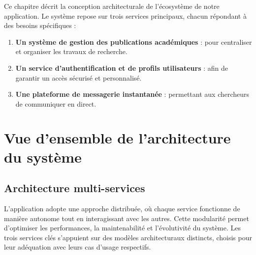 \documentclass{rapportPfe}
\begin{document}
Ce chapitre décrit la conception architecturale de l'écosystème de notre application. Le système repose sur trois services principaux, chacun répondant à des besoins spécifiques :

\begin{enumerate}
    \item \textbf{Un système de gestion des publications académiques} : pour centraliser et organiser les travaux de recherche.
    
    \item \textbf{Un service d’authentification et de profils utilisateurs} : afin de garantir un accès sécurisé et personnalisé.
    
    \item \textbf{Une plateforme de messagerie instantanée} : permettant aux chercheurs de communiquer en direct.
    
\end{enumerate}

\section{Vue d’ensemble de l’architecture du système}

\subsection{Architecture multi-services}

L’application adopte une approche distribuée, où chaque service fonctionne de manière autonome tout en interagissant avec les autres. Cette modularité permet d’optimiser les performances, la maintenabilité et l’évolutivité du système. Les trois services clés s’appuient sur des modèles architecturaux distincts, choisis pour leur adéquation avec leurs cas d’usage respectifs.
\end{document}
